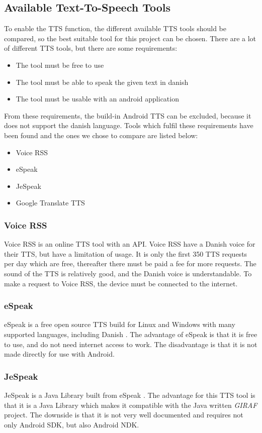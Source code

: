 \subsection{Available Text-To-Speech Tools}
\label{sec:ttstool}
To enable the TTS function, the different available TTS tools should be compared, so the best suitable tool for this project can be chosen.
There are a lot of different TTS tools, but there are some requirements:
\begin{itemize}
	\item The tool must be free to use
	\item The tool must be able to speak the given text in danish
	\item The tool must be usable with an android application
\end{itemize}
From these requirements, the build-in Android TTS can be excluded, because it does not support the danish language.
Tools which fulfil these requirements have been found and the ones we chose to compare are listed below:
\begin{itemize}
	\item Voice RSS
	\item eSpeak
	\item JeSpeak
	\item Google Translate TTS
\end{itemize}

\subsubsection{Voice RSS}
Voice RSS \citep{voicerss} is an online TTS tool with an API. Voice RSS have a Danish voice for their TTS, but have a limitation of usage. It is only the first 350 TTS requests per day which are free, thereafter there must be paid a fee for more requests. The sound of the TTS is relatively good, and the Danish voice is understandable. To make a request to Voice RSS, the device must be connected to the internet.

\subsubsection{eSpeak}
eSpeak is a free open source TTS build for Linux and Windows with many supported languages, including Danish \citep{espeak}. The advantage of eSpeak is that it is free to use, and do not need internet access to work. The disadvantage is that it is not made directly for use with Android. 

\subsubsection{JeSpeak}
JeSpeak is a Java Library built from eSpeak \citep{jespeak}. The advantage for this TTS tool is that it is a Java Library which makes it compatible with the Java written \textit{GIRAF} project. The downside is that it is not very well documented and requires not only Android SDK, but also Android NDK.

